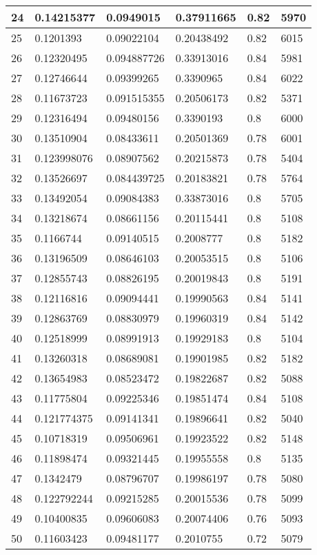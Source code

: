 \begin{longtable}{|l|l|l|l|l|l|}
24 & 0.14215377 & 0.0949015 & 0.37911665 & 0.82 & 5970 \\ \hline 
25 & 0.1201393 & 0.09022104 & 0.20438492 & 0.82 & 6015 \\ \hline 
26 & 0.12320495 & 0.094887726 & 0.33913016 & 0.84 & 5981 \\ \hline 
27 & 0.12746644 & 0.09399265 & 0.3390965 & 0.84 & 6022 \\ \hline 
28 & 0.11673723 & 0.091515355 & 0.20506173 & 0.82 & 5371 \\ \hline 
29 & 0.12316494 & 0.09480156 & 0.3390193 & 0.8 & 6000 \\ \hline 
30 & 0.13510904 & 0.08433611 & 0.20501369 & 0.78 & 6001 \\ \hline 
31 & 0.123998076 & 0.08907562 & 0.20215873 & 0.78 & 5404 \\ \hline 
32 & 0.13526697 & 0.084439725 & 0.20183821 & 0.78 & 5764 \\ \hline 
33 & 0.13492054 & 0.09084383 & 0.33873016 & 0.8 & 5705 \\ \hline 
34 & 0.13218674 & 0.08661156 & 0.20115441 & 0.8 & 5108 \\ \hline 
35 & 0.1166744 & 0.09140515 & 0.2008777 & 0.8 & 5182 \\ \hline 
36 & 0.13196509 & 0.08646103 & 0.20053515 & 0.8 & 5106 \\ \hline 
37 & 0.12855743 & 0.08826195 & 0.20019843 & 0.8 & 5191 \\ \hline 
38 & 0.12116816 & 0.09094441 & 0.19990563 & 0.84 & 5141 \\ \hline 
39 & 0.12863769 & 0.08830979 & 0.19960319 & 0.84 & 5142 \\ \hline 
40 & 0.12518999 & 0.08991913 & 0.19929183 & 0.8 & 5104 \\ \hline 
41 & 0.13260318 & 0.08689081 & 0.19901985 & 0.82 & 5182 \\ \hline 
42 & 0.13654983 & 0.08523472 & 0.19822687 & 0.82 & 5088 \\ \hline 
43 & 0.11775804 & 0.09225346 & 0.19851474 & 0.84 & 5108 \\ \hline 
44 & 0.121774375 & 0.09141341 & 0.19896641 & 0.82 & 5040 \\ \hline 
45 & 0.10718319 & 0.09506961 & 0.19923522 & 0.82 & 5148 \\ \hline 
46 & 0.11898474 & 0.09321445 & 0.19955558 & 0.8 & 5135 \\ \hline 
47 & 0.1342479 & 0.08796707 & 0.19986197 & 0.78 & 5080 \\ \hline 
48 & 0.122792244 & 0.09215285 & 0.20015536 & 0.78 & 5099 \\ \hline 
49 & 0.10400835 & 0.09606083 & 0.20074406 & 0.76 & 5093 \\ \hline 
50 & 0.11603423 & 0.09481177 & 0.2010755 & 0.72 & 5079 \\ \hline 
\end{longtable}